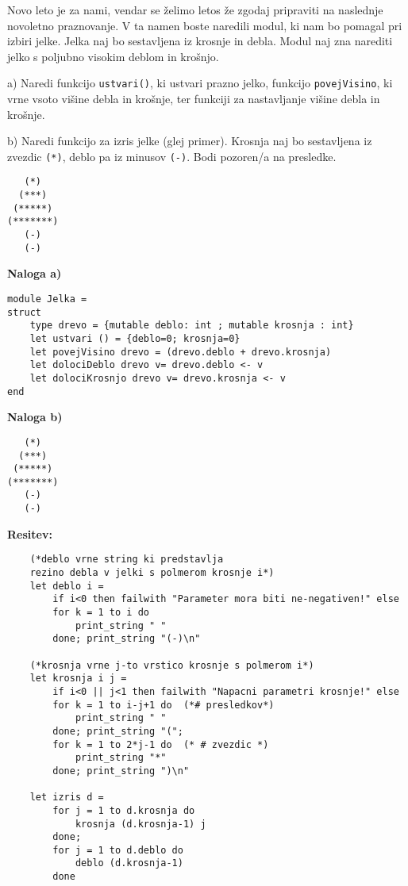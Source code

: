 \begin{ex}
Novo leto je za nami, vendar se \v zelimo letos \v ze zgodaj pripraviti na
naslednje novoletno praznovanje. V ta namen boste naredili modul, ki
nam bo pomagal pri izbiri jelke. Jelka naj bo sestavljena iz krosnje
in debla. Modul naj zna narediti jelko s poljubno visokim deblom in
kro\v snjo.

a) Naredi funkcijo \lstinline{ustvari()}, ki ustvari prazno jelko, funkcijo
\lstinline{povejVisino}, ki vrne vsoto vi\v sine debla in kro\v snje, ter funkciji za
nastavljanje vi\v sine debla in kro\v snje.

b) Naredi funkcijo za izris jelke (glej primer). Krosnja naj bo
sestavljena iz zvezdic \lstinline{(*)}, deblo pa iz minusov \lstinline{(-)}. Bodi pozoren/a
na presledke.
\begin{lstlisting}
   (*)
  (***)
 (*****)
(*******)
   (-)
   (-)
\end{lstlisting}

\begin{sol}

\textbf{Naloga a)}
\begin{lstlisting}
module Jelka =
struct
    type drevo = {mutable deblo: int ; mutable krosnja : int}
    let ustvari () = {deblo=0; krosnja=0}
    let povejVisino drevo = (drevo.deblo + drevo.krosnja)
    let dolociDeblo drevo v= drevo.deblo <- v
    let dolociKrosnjo drevo v= drevo.krosnja <- v
end
\end{lstlisting}
\textbf{Naloga b)}
\begin{lstlisting}
   (*)
  (***)
 (*****)
(*******)
   (-)
   (-)
\end{lstlisting}
\textbf{Resitev:}
\begin{lstlisting}
    (*deblo vrne string ki predstavlja 
    rezino debla v jelki s polmerom krosnje i*)
    let deblo i =
        if i<0 then failwith "Parameter mora biti ne-negativen!" else
        for k = 1 to i do 
            print_string " "
        done; print_string "(-)\n"
        
    (*krosnja vrne j-to vrstico krosnje s polmerom i*)
    let krosnja i j =
        if i<0 || j<1 then failwith "Napacni parametri krosnje!" else
        for k = 1 to i-j+1 do  (*# presledkov*)
            print_string " "
        done; print_string "(";
        for k = 1 to 2*j-1 do  (* # zvezdic *)
            print_string "*"
        done; print_string ")\n"
        
    let izris d = 
        for j = 1 to d.krosnja do
            krosnja (d.krosnja-1) j
        done;
        for j = 1 to d.deblo do
            deblo (d.krosnja-1)
        done
\end{lstlisting}

\end{sol}

\end{ex}



